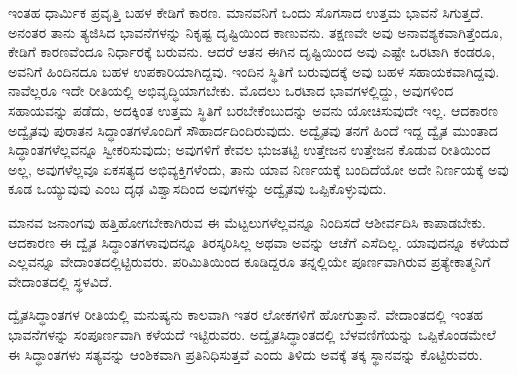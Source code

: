 \vskip 5pt

ಇಂತಹ ಧಾರ್ಮಿಕ ಪ್ರವೃತ್ತಿ ಬಹಳ ಕೇಡಿಗೆ ಕಾರಣ. ಮಾನವನಿಗೆ ಒಂದು ಸೊಗಸಾದ ಉತ್ತಮ ಭಾವನೆ ಸಿಗುತ್ತದೆ. ಅನಂತರ ತಾನು ತ್ಯಜಿಸಿದ ಭಾವನೆಗಳನ್ನು ನಿಕೃಷ್ಟ ದೃಷ್ಟಿಯಿಂದ ಕಾಣುವನು. ತಕ್ಷಣವೇ ಅವು ಅನಾವಶ್ಯಕವಾಗಿತ್ತೆಂದೂ, ಕೇಡಿಗೆ ಕಾರಣವೆಂದೂ ನಿರ್ಧಾರಕ್ಕೆ ಬರುವನು. ಆದರೆ ಆತನ ಈಗಿನ ದೃಷ್ಟಿಯಿಂದ ಅವು ಎಷ್ಟೇ ಒರಟಾಗಿ ಕಂಡರೂ, ಅವನಿಗೆ ಹಿಂದಿನದೂ ಬಹಳ ಉಪಕಾರಿಯಾಗಿದ್ದವು. ಇಂದಿನ ಸ್ಥಿತಿಗೆ ಬರುವುದಕ್ಕೆ ಅವು ಬಹಳ ಸಹಾಯಕವಾಗಿದ್ದವು. ನಾವೆಲ್ಲರೂ ಇದೇ ರೀತಿಯಲ್ಲಿ ಅಭಿವೃದ್ಧಿಯಾಗಬೇಕು. ಮೊದಲು ಒರಟಾದ ಭಾವಗಳಲ್ಲಿದ್ದು, ಅವುಗಳಿಂದ ಸಹಾಯವನ್ನು ಪಡೆದು, ಅದಕ್ಕಿಂತ ಉತ್ತಮ ಸ್ಥಿತಿಗೆ ಬರಬೇಕೆಂಬುದನ್ನು ಅವನು ಯೋಚಿಸುವುದೇ ಇಲ್ಲ. ಆದಕಾರಣ ಅದ್ವೈತವು ಪುರಾತನ ಸಿದ್ಧಾಂತಗಳೊಂದಿಗೆ ಸೌಹಾರ್ದದಿಂದಿರುವುದು. ಅದ್ವೈತವು ತನಗೆ ಹಿಂದೆ ಇದ್ದ ದ್ವೈತ ಮುಂತಾದ ಸಿದ್ಧಾಂತಗಳೆಲ್ಲವನ್ನೂ ಸ್ವೀಕರಿಸುವುದು; ಅವುಗಳಿಗೆ ಕೇವಲ ಭುಜತಟ್ಟಿ ಉತ್ತೇಜನ ಉತ್ತೇಜನ ಕೊಡುವ ರೀತಿಯಿಂದ ಅಲ್ಲ, ಅವುಗಳೆಲ್ಲವೂ ಏಕಸತ್ಯದ ಅಭಿವ್ಯಕ್ತಿಗಳೆಂದು, ತಾನು ಯಾವ ನಿರ್ಣಯಕ್ಕೆ ಬಂದಿದೆಯೋ ಅದೇ ನಿರ್ಣಯಕ್ಕೆ ಅವು ಕೂಡ ಒಯ್ಯುವುವು ಎಂಬ ದೃಢ ವಿಶ್ವಾಸದಿಂದ ಅವುಗಳನ್ನು ಅದ್ವೈತವು ಒಪ್ಪಿಕೊಳ್ಳುವುದು. 

ಮಾನವ ಜನಾಂಗವು ಹತ್ತಿಹೋಗಬೇಕಾಗಿರುವ ಈ ಮೆಟ್ಟಲುಗಳೆಲ್ಲವನ್ನೂ ನಿಂದಿಸದೆ ಆಶೀರ್ವದಿಸಿ ಕಾಪಾಡಬೇಕು. ಆದಕಾರಣ ಈ ದ್ವೈತ ಸಿದ್ಧಾಂತಗಳಾವುದನ್ನೂ ತಿರಸ್ಕರಿಸಿಲ್ಲ ಅಥವಾ ಅವನ್ನು ಆಚೆಗೆ ಎಸೆದಿಲ್ಲ. ಯಾವುದನ್ನೂ ಕಳೆಯದೆ ಎಲ್ಲವನ್ನೂ ವೇದಾಂತದಲ್ಲಿಟ್ಟಿರುವರು. ಪರಿಮಿತಿಯಿಂದ ಕೂಡಿದ್ದರೂ ತನ್ನಲ್ಲಿಯೇ ಪೂರ್ಣವಾಗಿರುವ ಪ್ರತ್ಯೇಕಾತ್ಮನಿಗೆ ವೇದಾಂತದಲ್ಲಿ ಸ್ಥಳವಿದೆ. 

ದ್ವೈತಸಿದ್ಧಾಂತಗಳ ರೀತಿಯಲ್ಲಿ ಮನುಷ್ಯನು ಕಾಲವಾಗಿ ಇತರ ಲೋಕಗಳಿಗೆ ಹೋಗುತ್ತಾನೆ. ವೇದಾಂತದಲ್ಲಿ ಇಂತಹ ಭಾವನೆಗಳನ್ನು ಸಂಪೂರ್ಣವಾಗಿ ಕಳೆಯದೆ ಇಟ್ಟಿರುವರು. ಅದ್ವೈತಸಿದ್ಧಾಂತದಲ್ಲಿ ಬೆಳವಣಿಗೆಯನ್ನು ಒಪ್ಪಿಕೊಂಡಮೇಲೆ ಈ ಸಿದ್ಧಾಂತಗಳು ಸತ್ಯವನ್ನು ಆಂಶಿಕವಾಗಿ ಪ್ರತಿನಿಧಿಸುತ್ತವೆ ಎಂದು ತಿಳಿದು ಅವಕ್ಕೆ ತಕ್ಕ ಸ್ಥಾನವನ್ನು ಕೊಟ್ಟಿರುವರು. 

